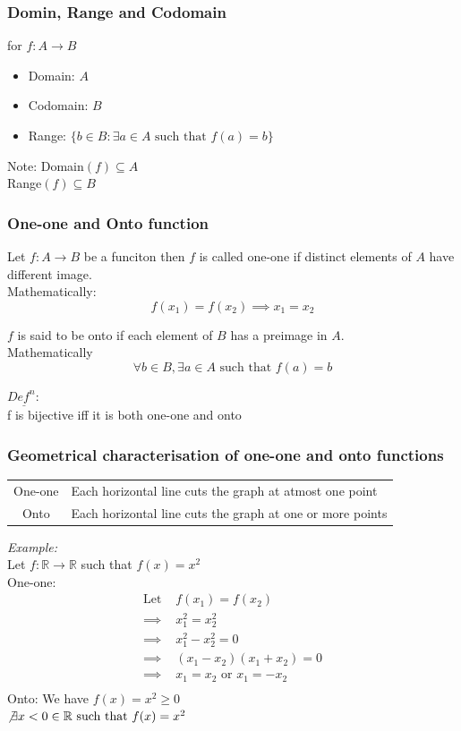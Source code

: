 \documentclass[11pt,letterpaper]{article}
\newenvironment{example}                             
        {\noindent\textit{Example:}\\}
	{}
\newenvironment{definition}
	{\begin{mdframed}$\underline{\textit{Def}^\textit{n}:} $\\}
	{\end{mdframed}}
\begin{document}
\subsubsection{Domin, Range and Codomain}
for $f: A \rightarrow B$
\begin{itemize}
  \item Domain: $A$
  \item Codomain: $B$
  \item Range: $\{b \in B: \exists a \in A \text{ such that } f(a) = b\}$
\end{itemize}
Note:
\indent  Domain$(f) \subseteq A$\\
\indent  Range$(f) \subseteq B$\\
\subsubsection{One-one and Onto function}
Let $f:A\rightarrow B$ be a funciton then $f$ is called one-one if distinct elements of $A$ have different image.\\
Mathematically:
\[
  f(x_1) = f(x_2) \implies x_1 = x_2
\]

$f$ is said to be onto if each element of $B$ has a preimage in $A$.\\
Mathematically
\[
  \forall b \in B, \exists a \in A \text{ such that } f(a) = b
\]

\begin{definition}
  f is bijective iff it is both one-one and onto
\end{definition}

\subsubsection{Geometrical characterisation of one-one and onto functions}
\begin{centering}
  \begin{table}
    \begin{tabular}{c l}
      One-one & Each horizontal line cuts the graph at atmost one point\\
      Onto & Each horizontal line cuts the graph at one or more points\\
    \end{tabular}
  \end{table}
\end{centering}
\begin{example}
  Let $f: \mathbb{R} \to \mathbb{R}$ such that $f(x) = x^2$\\ 
  One-one: 
  \begin{align*}
    \text{Let }&f(x_1) = f(x_2) \\
    \implies & x_1^2 = x_2^2 \\
    \implies & x_1^2 - x_2^2 = 0 \\
    \implies & (x_1 - x_2)(x_1 + x_2) = 0 \\
    \implies & x_1 = x_2 \text{ or } x_1 = -x_2\\
  \end{align*}
  Onto:
  We have $f(x) = x^2 \geq 0$\\
  $\not \exists x < 0 \in \mathbb{R} \text{ such that } f(x) = x^2$
\end{example}
\end{document}
